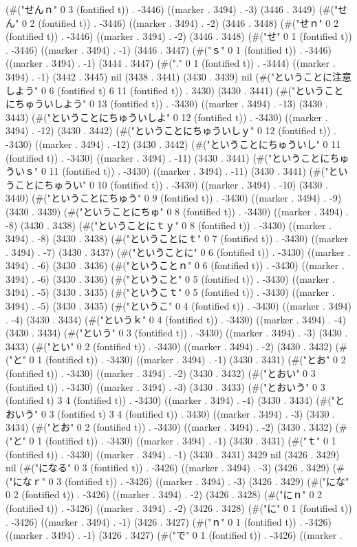 (#("せんｎ" 0 3 (fontified t)) . -3446) ((marker . 3494) . -3) (3446 . 3449) (#("せん" 0 2 (fontified t)) . -3446) ((marker . 3494) . -2) (3446 . 3448) (#("せｎ" 0 2 (fontified t)) . -3446) ((marker . 3494) . -2) (3446 . 3448) (#("せ" 0 1 (fontified t)) . -3446) ((marker . 3494) . -1) (3446 . 3447) (#("ｓ" 0 1 (fontified t)) . -3446) ((marker . 3494) . -1) (3444 . 3447) (#("." 0 1 (fontified t)) . -3444) ((marker . 3494) . -1) (3442 . 3445) nil (3438 . 3441) (3430 . 3439) nil (#("ということに注意しよう" 0 6 (fontified t) 6 11 (fontified t)) . 3430) (3430 . 3441) (#("ということにちゅういしよう" 0 13 (fontified t)) . -3430) ((marker . 3494) . -13) (3430 . 3443) (#("ということにちゅういしよ" 0 12 (fontified t)) . -3430) ((marker . 3494) . -12) (3430 . 3442) (#("ということにちゅういしｙ" 0 12 (fontified t)) . -3430) ((marker . 3494) . -12) (3430 . 3442) (#("ということにちゅういし" 0 11 (fontified t)) . -3430) ((marker . 3494) . -11) (3430 . 3441) (#("ということにちゅういｓ" 0 11 (fontified t)) . -3430) ((marker . 3494) . -11) (3430 . 3441) (#("ということにちゅうい" 0 10 (fontified t)) . -3430) ((marker . 3494) . -10) (3430 . 3440) (#("ということにちゅう" 0 9 (fontified t)) . -3430) ((marker . 3494) . -9) (3430 . 3439) (#("ということにちゅ" 0 8 (fontified t)) . -3430) ((marker . 3494) . -8) (3430 . 3438) (#("ということにｔｙ" 0 8 (fontified t)) . -3430) ((marker . 3494) . -8) (3430 . 3438) (#("ということにｔ" 0 7 (fontified t)) . -3430) ((marker . 3494) . -7) (3430 . 3437) (#("ということに" 0 6 (fontified t)) . -3430) ((marker . 3494) . -6) (3430 . 3436) (#("ということｎ" 0 6 (fontified t)) . -3430) ((marker . 3494) . -6) (3430 . 3436) (#("ということ" 0 5 (fontified t)) . -3430) ((marker . 3494) . -5) (3430 . 3435) (#("というこｔ" 0 5 (fontified t)) . -3430) ((marker . 3494) . -5) (3430 . 3435) (#("というこ" 0 4 (fontified t)) . -3430) ((marker . 3494) . -4) (3430 . 3434) (#("というｋ" 0 4 (fontified t)) . -3430) ((marker . 3494) . -4) (3430 . 3434) (#("という" 0 3 (fontified t)) . -3430) ((marker . 3494) . -3) (3430 . 3433) (#("とい" 0 2 (fontified t)) . -3430) ((marker . 3494) . -2) (3430 . 3432) (#("と" 0 1 (fontified t)) . -3430) ((marker . 3494) . -1) (3430 . 3431) (#("とお" 0 2 (fontified t)) . -3430) ((marker . 3494) . -2) (3430 . 3432) (#("とおい" 0 3 (fontified t)) . -3430) ((marker . 3494) . -3) (3430 . 3433) (#("とおいう" 0 3 (fontified t) 3 4 (fontified t)) . -3430) ((marker . 3494) . -4) (3430 . 3434) (#("とおいう" 0 3 (fontified t) 3 4 (fontified t)) . 3430) ((marker . 3494) . -3) (3430 . 3434) (#("とお" 0 2 (fontified t)) . -3430) ((marker . 3494) . -2) (3430 . 3432) (#("と" 0 1 (fontified t)) . -3430) ((marker . 3494) . -1) (3430 . 3431) (#("ｔ" 0 1 (fontified t)) . -3430) ((marker . 3494) . -1) (3430 . 3431) 3429 nil (3426 . 3429) nil (#("になる" 0 3 (fontified t)) . -3426) ((marker . 3494) . -3) (3426 . 3429) (#("になｒ" 0 3 (fontified t)) . -3426) ((marker . 3494) . -3) (3426 . 3429) (#("にな" 0 2 (fontified t)) . -3426) ((marker . 3494) . -2) (3426 . 3428) (#("にｎ" 0 2 (fontified t)) . -3426) ((marker . 3494) . -2) (3426 . 3428) (#("に" 0 1 (fontified t)) . -3426) ((marker . 3494) . -1) (3426 . 3427) (#("ｎ" 0 1 (fontified t)) . -3426) ((marker . 3494) . -1) (3426 . 3427) (#("で" 0 1 (fontified t)) . -3426) ((marker . 